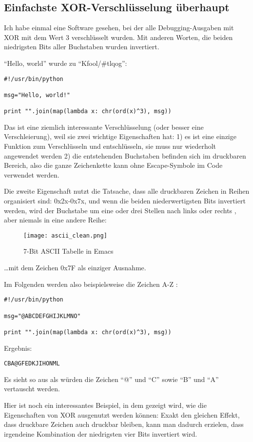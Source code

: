 \subsection{Einfachste XOR-Verschlüsselung überhaupt}

Ich habe einmal eine Software gesehen, bei der alle Debugging-Ausgaben mit XOR mit dem Wert 3
verschlüsselt wurden. Mit anderen Worten, die beiden niedrigsten Bits aller Buchstaben wurden invertiert.

``Hello, world'' wurde zu ``Kfool/\#tlqog'':

\begin{lstlisting}
#!/usr/bin/python

msg="Hello, world!"

print "".join(map(lambda x: chr(ord(x)^3), msg))
\end{lstlisting}

Das ist eine ziemlich interessante Verschlüsselung (oder besser eine Verschleierung),
weil sie zwei wichtige Eigenschaften hat:
1) es ist eine einzige Funktion zum Verschlüsseln und entschlüsseln, sie muss nur wiederholt angewendet werden
2) die entstehenden Buchstaben befinden sich im druckbaren Bereich, also die ganze Zeichenkette kann ohne
Escape-Symbole im Code verwendet werden.

Die zweite Eigenschaft nutzt die Tatsache, dass alle druckbaren Zeichen in Reihen organisiert sind: 0x2x-0x7x,
und wenn die beiden niederwertigsten Bits invertiert werden, wird der Buchstabe um eine oder drei Stellen nach
links oder rechts , aber niemals in eine andere Reihe:

\begin{figure}[H]
\centering
\texttt{[image: ascii\_clean.png]}
\caption{7-Bit \ac{ASCII} Tabelle in Emacs}
\end{figure}

\dots mit dem Zeichen 0x7F als einziger Ausnahme.

Im Folgenden werden also beispielsweise die Zeichen A-Z :

\begin{lstlisting}
#!/usr/bin/python

msg="@ABCDEFGHIJKLMNO"

print "".join(map(lambda x: chr(ord(x)^3), msg))
\end{lstlisting}

Ergebnis:
\begin{lstlisting}
CBA@GFEDKJIHONML
\end{lstlisting}

Es sieht so aus als würden die Zeichen ``@'' und ``C'' sowie ``B'' und ``A'' vertauscht werden.

Hier ist noch ein interessantes Beispiel, in dem gezeigt wird, wie die Eigenschaften von XOR
ausgenutzt werden können: Exakt den gleichen Effekt, dass druckbare Zeichen auch druckbar bleiben,
kann man dadurch erzielen, dass irgendeine Kombination der niedrigsten vier Bits invertiert wird.
